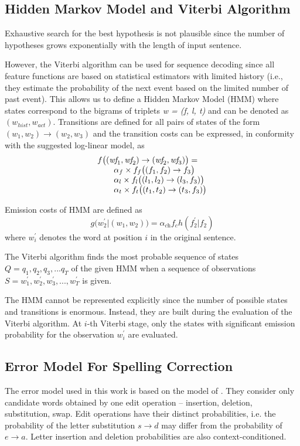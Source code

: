 \documentclass[11pt]{article}
\begin{document}
\subsection{Hidden Markov Model and Viterbi Algorithm}
Exhaustive search for the best hypothesis is not plausible since the number of
hypotheses grows exponentially with the length of input sentence.

However, the Viterbi algorithm can be used for sequence decoding since all feature
functions are based on statistical estimators with limited history (i.e., they
estimate the probability of the next event based on the limited number of past
event). This allows us to define a Hidden Markov Model (HMM) where states
correspond to the bigrams of triplets \emph{w = (f, l, t)} and can be
denoted as $ (\textit{w}_{hist}, \textit{w}_{act}) $. Transitions are defined
for all pairs of states of the form $ (\textit{w}_1, \textit{w}_2) \to
(\textit{w}_2, \textit{w}_3)$ and the transition costs can be expressed, in
conformity with the suggested log-linear model, as
\[
    \begin{array}{rcl}
    \multicolumn{3}{l}{f\bigl((\textit{wf}_1, \textit{wf}_2) \to (\textit{wf}_2, \textit{wf}_3)\bigr) =}\\
    &  & \alpha_f \times f_f\bigl( (f_1, f_2) \to f_3 \bigr)\\
    &    & \alpha_l \times f_l\bigl( (l_1, l_2) \to (l_3, f_3) \bigr)\\
    &    & \alpha_t \times f_t\bigl( (t_1, t_2) \to (t_3, f_3) \bigr)  
    \end{array}
\]

Emission costs of HMM are defined as
\[
    g\bigl(w_2^{'} | (\textit{w}_1, \textit{w}_2) \bigr) = \alpha_{\textit{ch}} f_ch(f_2^{'} | f_2)
\]
where $w_i^{'}$ denotes the word at position $i$ in the original sentence.

The Viterbi algorithm \cite{viterbi:1967} finds the most probable sequence of states $Q = q_1, q_2, q_3,
... q_T$ of the given HMM when a sequence of observations $S =
w_1^{'},w_2^{'},w_3^{'}, ..., w_T^{'}$ is given.

The HMM cannot be represented explicitly since the number of possible states
and transitions is enormous. Instead, they are built during the evaluation
of the Viterbi algorithm. At $i$-th Viterbi stage, only the states with significant
emission probability for the observation $w_i^{'}$ are evaluated.

\subsection{Error Model For Spelling Correction}
The error model used in this work is based on the model of \cite{Church1991}.
They consider only candidate words obtained by one edit operation -- insertion,
deletion, substitution, swap. Edit operations have their distinct
probabilities, i.e. the probability of the letter substitution $s \to d$ may
differ from the probability of $e \to a$. Letter insertion and deletion
probabilities are also context-conditioned. 
\end{document}
